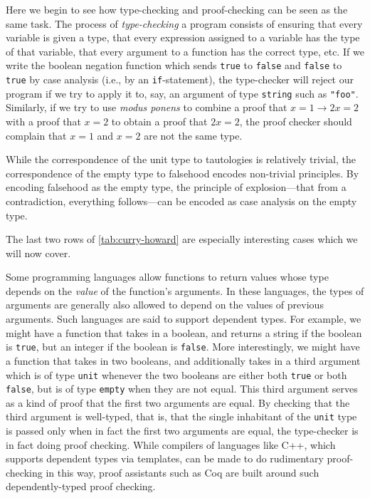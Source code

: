 Here we begin to see how type-checking and proof-checking can be seen as the same task.
The process of \emph{type-checking} a program consists of ensuring that every variable is given a type, that every expression assigned to a variable has the type of that variable, that every argument to a function has the correct type, etc.
If we write the boolean negation function which sends \texttt{true} to \texttt{false} and \texttt{false} to \texttt{true} by case analysis (i.e., by an \texttt{if}-statement), the type-checker will reject our program if we try to apply it to, say, an argument of type \texttt{string} such as \verb|"foo"|.
Similarly, if we try to use \emph{modus ponens} to combine a proof that $x = 1 \to 2x = 2$ with a proof that $x = 2$ to obtain a proof that $2x = 2$, the proof checker should complain that $x = 1$ and $x = 2$ are not the same type.

While the correspondence of the unit type to tautologies is relatively trivial, the correspondence of the empty type to falsehood encodes non-trivial principles.
By encoding falsehood as the empty type, the principle of explosion---that from a contradiction, everything follows---can be encoded as case analysis on the empty type.

The last two rows of \autoref{tab:curry-howard} are especially interesting cases which we will now cover.

Some programming languages allow functions to return values whose type depends on the \emph{value} of the function's arguments.
In these languages, the types of arguments are generally also allowed to depend on the values of previous arguments.
Such languages are said to support dependent types.
For example, we might have a function that takes in a boolean, and returns a string if the boolean is \texttt{true}, but an integer if the boolean is \texttt{false}.
More interestingly, we might have a function that takes in two booleans, and additionally takes in a third argument which is of type \texttt{unit} whenever the two booleans are either both \texttt{true} or both \texttt{false}, but is of type \texttt{empty} when they are not equal.
This third argument serves as a kind of proof that the first two arguments are equal.
By checking that the third argument is well-typed, that is, that the single inhabitant of the \texttt{unit} type is passed only when in fact the first two arguments are equal, the type-checker is in fact doing proof checking.
While compilers of languages like C++, which supports dependent types via templates, can be made to do rudimentary proof-checking in this way, proof assistants such as Coq are built around such dependently-typed proof checking.

